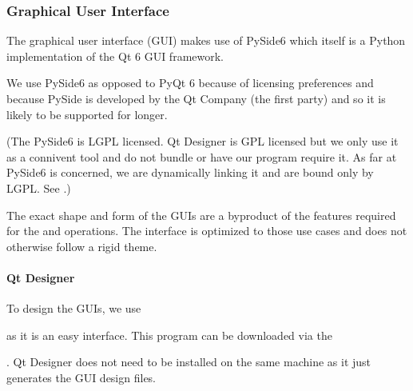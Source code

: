 \documentclass[letterpaper,11pt,english]{sphinxmanual}
\begin{document}
\sphinxstepscope


\subsubsection{Graphical User Interface}
\label{\detokenize{technical/architecture/graphical_user_interface:graphical-user-interface}}\label{\detokenize{technical/architecture/graphical_user_interface:technical-architecture-graphical-user-interface}}\label{\detokenize{technical/architecture/graphical_user_interface::doc}}
\sphinxAtStartPar
The graphical user interface (GUI) makes use of PySide6 which itself is a
Python implementation of the Qt 6 GUI framework.

\sphinxAtStartPar
We use PySide6 as opposed to PyQt 6 because of licensing preferences and
because PySide is developed by the Qt Company (the first party) and so it is
likely to be supported for longer.

\sphinxAtStartPar
(The PySide6 is LGPL licensed. Qt Designer is GPL licensed but we only use it
as a connivent tool and do not bundle or have our program require it. As far
at PySide6 is concerned, we are dynamically linking it and are bound only by
LGPL. See {\hyperref[\detokenize{technical/license:technical-architecture-license}]{}}.)

\sphinxAtStartPar
The exact shape and form of the GUIs are a byproduct of the features required
for the {\hyperref[\detokenize{user/manual_mode:user-manual-mode}]{}} and {\hyperref[\detokenize{user/automatic_mode:user-automatic-mode}]{}} operations.
The interface is optimized to those use cases and does not otherwise follow
a rigid theme.


\paragraph{Qt Designer}
\label{\detokenize{technical/architecture/graphical_user_interface:qt-designer}}
\sphinxAtStartPar
To design the GUIs, we use
%
\begin{footnote}[58]\sphinxAtStartFootnote
{}
%
\end{footnote} as it is an
easy interface. This program can be downloaded via the
%
\begin{footnote}[59]\sphinxAtStartFootnote
{}
%
\end{footnote}.
Qt Designer does not need to be installed on the same machine as it just
generates the GUI design files.
\end{document}
